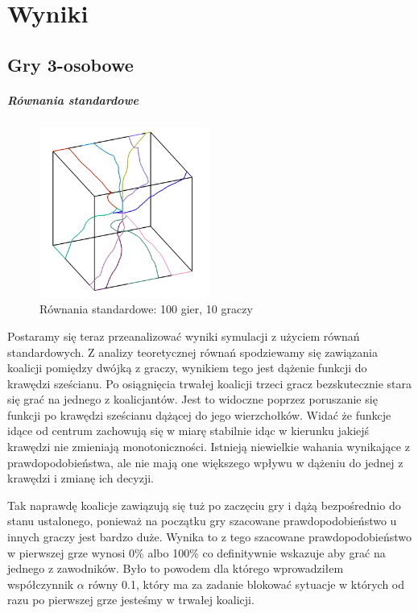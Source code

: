 \chapter{Wyniki}
\label{cha:wyniki}

\section{Gry 3-osobowe}
\label{sec:N3nzal}

\paragraph{Równania standardowe}
\label{sec:r_stan}
\begin{figure}
    \centering
    \includegraphics[width=0.5\textwidth]{pict/wyniki/stand100_10.png}   
    \caption{Równania standardowe: 100 gier, 10 graczy}
	\label{fig:stand50_10} 
\end{figure}

Postaramy się teraz przeanalizować wyniki symulacji z użyciem równań standardowych. Z analizy teoretycznej równań spodziewamy się zawiązania koalicji pomiędzy dwójką z graczy, wynikiem tego jest dążenie funkcji do krawędzi sześcianu. Po osiągnięcia trwałej koalicji trzeci gracz bezskutecznie stara się grać na jednego z koalicjantów. Jest to widoczne poprzez poruszanie się funkcji po krawędzi sześcianu dążącej do jego wierzchołków. Widać że funkcje idące od centrum zachowują się w miarę stabilnie idąc w kierunku jakiejś krawędzi nie zmieniają monotoniczności. Istnieją niewielkie wahania wynikające z prawdopodobieństwa, ale nie mają one większego wpływu w dążeniu do jednej z krawędzi i zmianę ich decyzji. 

Tak naprawdę koalicje zawiązują się tuż po zaczęciu gry i dążą bezpośrednio do stanu ustalonego,  ponieważ na początku gry szacowane prawdopodobieństwo u innych graczy jest bardzo duże. Wynika to z tego szacowane prawdopodobieństwo w pierwszej grze wynosi 0\% albo 100\% co definitywnie wskazuje aby grać na jednego z zawodników. Było to powodem dla którego wprowadziłem współczynnik $\alpha$ równy 0.1, który ma za zadanie blokować sytuacje w których od razu po pierwszej grze jesteśmy w trwałej koalicji.

